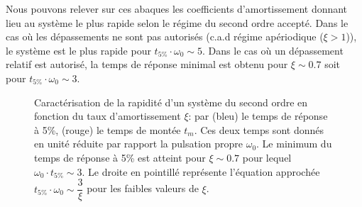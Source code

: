 Nous pouvons relever sur ces abaques les coefficients d'amortissement donnant
lieu au système le plus rapide selon le régime du second ordre accepté.
Dans le cas où les dépassements ne sont pas autorisés (c.a.d régime 
apériodique ($\xi>1$)), le système est le plus rapide pour 
$t_{5\%}\cdot\omega_0\sim5$. Dans le cas où un dépassement relatif est 
autorisé, la temps de réponse minimal est obtenu pour $\xi\sim 0.7$ soit
pour $t_{5\%}\cdot\omega_0\sim3$.

\begin{figure}
\centering
{}
\caption{Caractérisation de la rapidité d'un système du second ordre en
         fonction du taux d'amortissement $\xi$: par
         (bleu) le temps de réponse à 5\%,  
         (rouge) le temps de montée $t_m$.
         Ces deux temps sont donnés en unité réduite
         par rapport la pulsation propre $\omega_0$.
         Le minimum du temps de réponse à 5\% est atteint pour $\xi\sim0.7$ 
         pour lequel $\omega_0\cdot t_{5\%}\sim3$.
         Le droite en pointillé représente l'équation approchée 
         $t_{5\%}\cdot\omega_0\sim\dfrac{3}{\xi}$ pour les faibles valeurs de 
         $\xi$.
         \label{fig-2nd_temps_reponse_1}}
\end{figure}
\clearpage

